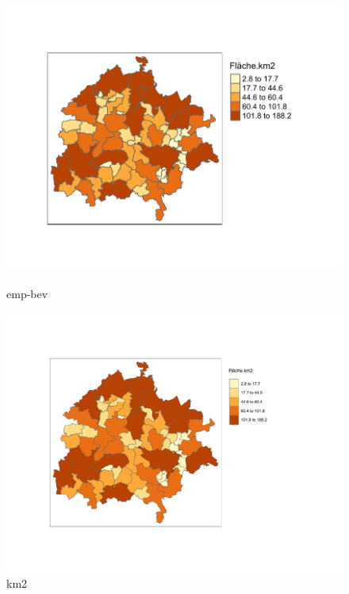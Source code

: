 \begin{figure} %
    \centering %
    \begin{minipage}[b]{.45\linewidth} %
       \includegraphics[scale=0.7,trim={1cm 2cm 1cm 2cm},clip]{body/figures/Rplot.pdf} %
       \caption{emp-bev}
    \end{minipage} %
    \hfill
    \begin{minipage}[b]{.45\linewidth}
       \includegraphics[width=\linewidth,trim={1cm 2cm 1cm 2cm},clip]{body/figures/km2.pdf}
       \caption{km2}
    \end{minipage}
 \end{figure}



